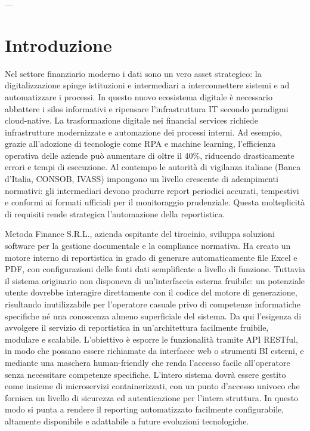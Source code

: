 



---



\section{Introduzione}
Nel settore finanziario moderno i dati sono un vero asset strategico: la digitalizzazione spinge istituzioni e intermediari a interconnettere sistemi e ad automatizzare i processi. In questo nuovo ecosistema digitale è necessario abbattere i silos informativi e ripensare l’infrastruttura IT secondo paradigmi cloud-native.
La trasformazione digitale nei financial services richiede infrastrutture modernizzate e automazione dei processi interni. Ad esempio, grazie all’adozione di tecnologie come RPA e machine learning, l’efficienza operativa delle aziende può aumentare di oltre il 40\%, riducendo drasticamente errori e tempi di esecuzione. Al contempo le autorità di vigilanza italiane (Banca d’Italia, CONSOB, IVASS) impongono un livello crescente di adempimenti normativi: gli intermediari devono produrre report periodici accurati, tempestivi e conformi ai formati ufficiali per il monitoraggio prudenziale. Questa molteplicità di requisiti rende strategica l’automazione della reportistica.

Metoda Finance S.R.L., azienda ospitante del tirocinio, sviluppa soluzioni software per la gestione documentale e la compliance normativa. Ha creato un motore interno di reportistica in grado di generare automaticamente file Excel e PDF, con configurazioni delle fonti dati semplificate a livello di funzione. Tuttavia il sistema originario non disponeva di un’interfaccia esterna fruibile: un potenziale utente dovrebbe interagire direttamente con il codice del motore di generazione, risultando inutilizzabile per l'operatore casuale privo di competenze informatiche specifiche né una conoscenza almeno superficiale del sistema. Da qui l’esigenza di avvolgere il servizio di reportistica in un'architettura facilmente fruibile, modulare e scalabile. L’obiettivo è esporre le funzionalità tramite API RESTful, in modo che possano essere richiamate da interfacce web o strumenti BI esterni, e mediante una maschera human-friendly che renda l'accesso facile all'operatore senza necessitare competenze specifiche. L’intero sistema dovrà essere gestito come insieme di microservizi containerizzati, con un punto d'accesso univoco che fornisca un livello di sicurezza ed autenticazione per l'intera struttura. In questo modo si punta a rendere il reporting automatizzato facilmente configurabile, altamente disponibile e adattabile a future evoluzioni tecnologiche.

